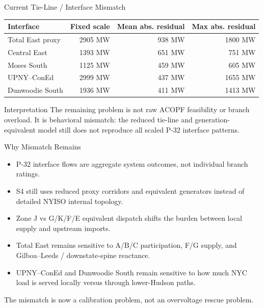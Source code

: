 \documentclass[aspectratio=169,10pt]{beamer}
\begin{document}
\begin{frame}{Current Tie-Line / Interface Mismatch}
\scriptsize
\begin{tabularx}{\linewidth}{X r r r}
\toprule
\textbf{Interface} & \textbf{Fixed scale} & \textbf{Mean abs. residual} & \textbf{Max abs. residual} \\
\midrule
Total East proxy & 2905 MW & 938 MW & 1800 MW \\
Central East & 1393 MW & 651 MW & 751 MW \\
Moses South & 1125 MW & 459 MW & 605 MW \\
UPNY--ConEd & 2999 MW & 437 MW & 1655 MW \\
Dunwoodie South & 1936 MW & 411 MW & 1413 MW \\
\bottomrule
\end{tabularx}

\vspace{0.7em}
\begin{block}{Interpretation}
The remaining problem is not raw ACOPF feasibility or branch overload. It is behavioral mismatch: the reduced tie-line and generation-equivalent model still does not reproduce all scaled P-32 interface patterns.
\end{block}
\end{frame}

\begin{frame}{Why Mismatch Remains}
\begin{itemize}
  \item P-32 interface flows are aggregate system outcomes, not individual branch ratings.
  \item S4 still uses reduced proxy corridors and equivalent generators instead of detailed NYISO internal topology.
  \item Zone J vs G/K/F/E equivalent dispatch shifts the burden between local supply and upstream imports.
  \item Total East remains sensitive to A/B/C participation, F/G supply, and Gilboa--Leeds / downstate-spine reactance.
  \item UPNY--ConEd and Dunwoodie South remain sensitive to how much NYC load is served locally versus through lower-Hudson paths.
\end{itemize}

\vspace{0.5em}
\begin{center}
\small The mismatch is now a calibration problem, not an overvoltage rescue problem.
\end{center}
\end{frame}
\end{document}
